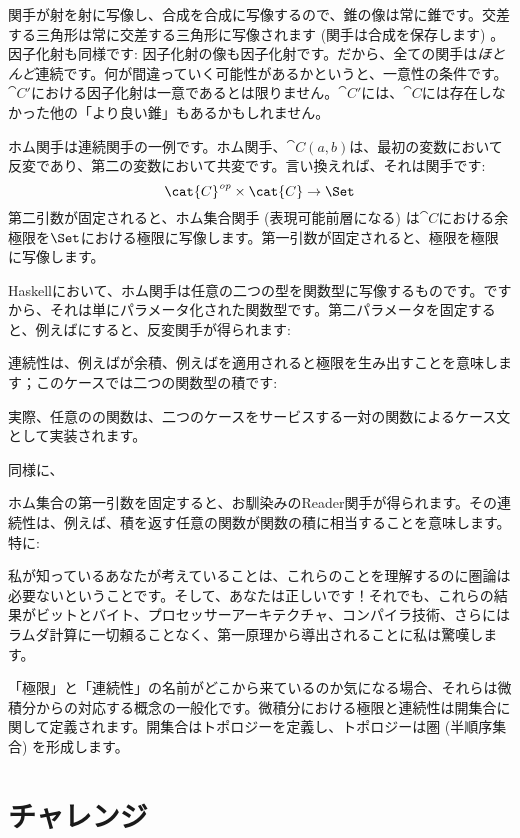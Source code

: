 \noindent
関手が射を射に写像し、合成を合成に写像するので、錐の像は常に錐です。交差する三角形は常に交差する三角形に写像されます (関手は合成を保存します) 。因子化射も同様です: 因子化射の像も因子化射です。だから、全ての関手は\emph{ほとんど}連続です。何が間違っていく可能性があるかというと、一意性の条件です。$\cat{C'}$における因子化射は一意であるとは限りません。$\cat{C'}$には、$\cat{C}$には存在しなかった他の「より良い錐」もあるかもしれません。

ホム関手は連続関手の一例です。ホム関手、$\cat{C}(a, b)$は、最初の変数において反変であり、第二の変数において共変です。言い換えれば、それは関手です: 
\[\cat{C}^\mathit{op} \times \cat{C} \to \Set\]
第二引数が固定されると、ホム集合関手 (表現可能前層になる) は$\cat{C}$における余極限を$\Set$における極限に写像します。第一引数が固定されると、極限を極限に写像します。

Haskellにおいて、ホム関手は任意の二つの型を関数型に写像するものです。ですから、それは単にパラメータ化された関数型です。第二パラメータを固定すると、例えばにすると、反変関手が得られます: 

連続性は、例えばが余積、例えばを適用されると極限を生み出すことを意味します；このケースでは二つの関数型の積です: 

実際、任意のの関数は、二つのケースをサービスする一対の関数によるケース文として実装されます。

同様に、

ホム集合の第一引数を固定すると、お馴染みのReader関手が得られます。その連続性は、例えば、積を返す任意の関数が関数の積に相当することを意味します。特に: 

私が知っているあなたが考えていることは、これらのことを理解するのに圏論は必要ないということです。そして、あなたは正しいです！それでも、これらの結果がビットとバイト、プロセッサーアーキテクチャ、コンパイラ技術、さらにはラムダ計算に一切頼ることなく、第一原理から導出されることに私は驚嘆します。

「極限」と「連続性」の名前がどこから来ているのか気になる場合、それらは微積分からの対応する概念の一般化です。微積分における極限と連続性は開集合に関して定義されます。開集合はトポロジーを定義し、トポロジーは圏 (半順序集合) を形成します。

\section{チャレンジ}

